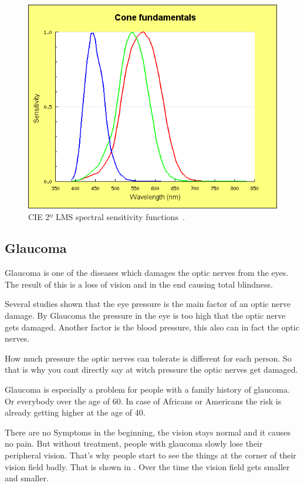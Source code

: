 \documentclass{sig-alternate-05-2015}
\begin{document}
\begin{figure}
    \includegraphics[width=\columnwidth]{lms-sensitivity.png}
    \caption{CIE 2º LMS spectral sensitivity functions~\cite{cvrl-lms-web}.}
    \label{fig:lmscurves}
\end{figure}

\subsection{Glaucoma}

Glaucoma is one of the diseases which damages the optic nerves from the eyes. The result of this is a loss of vision and in the end causing total blindness. 

Several studies shown that the eye pressure is the main factor of an optic nerve damage. By Glaucoma the pressure in the eye is too high that the optic nerve gets damaged. Another factor is the blood pressure, this also can in fact the optic nerves.

How much pressure the optic nerves can tolerate is different for each person. So that is why you cant directly say at witch pressure the optic nerves get damaged.

Glaucoma is especially a problem for people with a family history of glaucoma. Or everybody over the age of 60. In case of Africans or Americans the risk is already getting higher at the age of 40.

There are no Symptoms in the beginning, the vision stays normal and it causes no pain. But without treatment, people with glaucoma slowly lose their peripheral vision. That's why people start to see the things at the corner of their vision field badly. That is shown in . Over the time the vision field gets smaller and smaller.~\cite{glaucomafacts}
\end{document}
